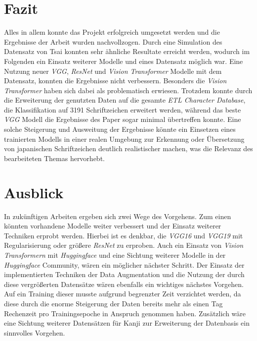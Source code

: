 \documentclass[twoside,a4paper]{IEEEtran}
\begin{document}
\section{Fazit} %
Alles in allem konnte das Projekt erfolgreich umgesetzt werden und die Ergebnisse der Arbeit \cite{RHC} wurden nachvollzogen. Durch eine Simulation des Datensatz von Tsai konnten sehr ähnliche Resultate erreicht werden, wodurch im Folgenden ein Einsatz weiterer Modelle und eines Datensatz möglich war. Eine Nutzung neuer \emph{VGG}, \emph{ResNet} und \emph{Vision Transformer} Modelle mit dem Datensatz, konnten die Ergebnisse nicht verbessern. Besonders die \emph{Vision Transformer} haben sich dabei als problematisch erwiesen. Trotzdem konnte durch die Erweiterung der genutzten Daten auf die gesamte \emph{ETL Character Database}, die Klassifikation auf 3191 Schriftzeichen erweitert werden, während das beste \emph{VGG} Modell die Ergebnisse des Paper \cite{RHC} sogar minimal übertreffen konnte. Eine solche Steigerung und Ausweitung der Ergebnisse könnte ein Einsetzen eines trainierten Modells in einer realen Umgebung zur Erkennung oder Übersetzung von japanischen Schriftzeichen deutlich realistischer machen, was die Relevanz des bearbeiteten Themas hervorhebt.
\section{Ausblick}
In zukünftigen Arbeiten ergeben sich zwei Wege des Vorgehens. Zum einen könnten vorhandene Modelle weiter verbessert und der Einsatz weiterer Techniken erprobt werden. Hierbei ist es denkbar, die \emph{VGG16} und \emph{VGG19} mit Regularisierung oder größere \emph{ResNet} zu erproben. Auch ein Einsatz von \emph{Vision Transformern} mit \emph{Huggingface} und eine Sichtung weiterer Modelle in der \emph{Huggingface} Community, wären ein möglicher nächster Schritt. Der Einsatz der implementierten Techniken der Data Augmentation und die Nutzung der durch diese vergrößerten Datensätze wären ebenfalls ein wichtiges nächstes Vorgehen. Auf ein Training dieser musste aufgrund begrenzter Zeit verzichtet werden, da diese durch die enorme Steigerung der Daten bereits mehr als einen Tag Rechenzeit pro Trainingsepoche in Anspruch genommen haben. Zusätzlich wäre eine Sichtung weiterer Datensätzen für Kanji zur Erweiterung der Datenbasis ein sinnvolles Vorgehen.
\end{document}
